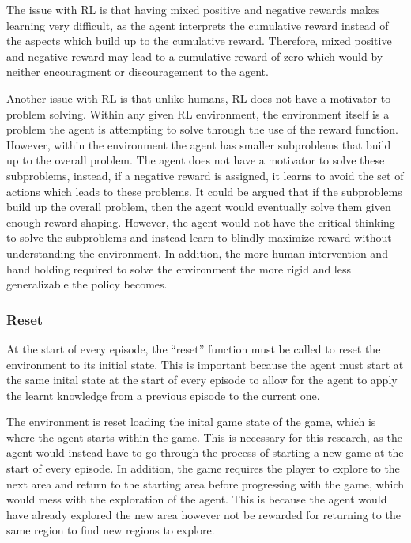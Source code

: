 The issue with RL is that having mixed positive and negative rewards makes learning very difficult, as the agent interprets the cumulative reward instead of the aspects  which build up to the cumulative reward. Therefore, mixed positive and negative reward may lead to a cumulative reward of zero which would by neither encouragment or discouragement to the agent. 

Another issue with RL is that unlike humans, RL does not have a motivator to problem solving. Within any given RL environment, the environment itself is a problem the agent is attempting to solve through the use of the reward function. However, within the environment the agent has smaller subproblems that build up to the overall problem. The agent does not have a motivator to solve these subproblems, instead, if a negative reward is assigned, it learns to avoid the set of actions which leads to these problems. It could be argued that if the subproblems build up the overall problem, then the agent would eventually solve them given enough reward shaping. However, the agent would not have the critical thinking to solve the subproblems and instead learn to blindly maximize reward without understanding the environment. In addition, the more human intervention and hand holding required to solve the environment the more rigid and less generalizable the policy becomes.

\subsubsection*{Reset}

At the start of every episode, the ``reset'' function must be called to reset the environment to its initial state. This is important because the agent must start at the same inital state at the start of every episode to allow for the agent to apply the learnt knowledge from a previous episode to the current one. 

The environment is reset loading the inital game state of the game, which is where the agent starts within the game. This is necessary for this research, as the agent would instead have to go through the process of starting a new game at the start of every episode. In addition, the game requires the player to explore to the next area and return to the starting area before progressing with the game, which would mess with the exploration of the agent. This is because the agent would have already explored the new area however not be rewarded for returning to the same region to find new regions to explore.

